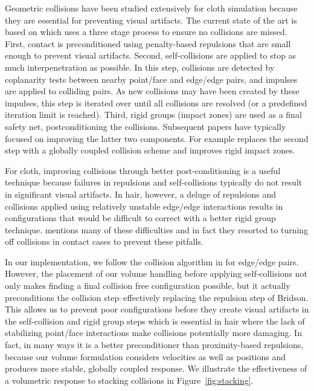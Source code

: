 Geometric collisions have been studied extensively for cloth simulation because
they are essential for preventing visual artifacts. The current state of the art
is based on \cite{bridson:2002:cloth} which uses a three stage process to ensure
no collisions are missed. First, contact is preconditioned using penalty-based
repulsions that are small enough to prevent visual artifacts. Second,
self-collisions are applied to stop as much interpenetration as
possible. In this step, collisions are detected by coplanarity tests
between nearby point/face and edge/edge pairs, and impulses are
applied to colliding pairs.  As new collisions may have been created
by these impulses, this step is iterated over until all collisions are
resolved (or a predefined iteration limit is reached). Third, rigid groups (impact zones) are used as 
a final safety net,
postconditioning the collisions. Subsequent papers have typically focused on
improving the latter two components. For example \cite{sifakis:2008:cloth}
replaces the second step with a globally coupled collision scheme and
\cite{harmon:2008:cloth} improves rigid impact zones.

For cloth, improving collisions through better post-conditioning is a useful
technique because failures in repulsions and self-collisions typically do not
result in significant visual artifacts.  In hair, however, a deluge of
repulsions and collisions applied using relatively unstable edge/edge
interactions results in configurations that would be difficult to correct with a
better rigid group technique.  \cite{selle:2008:hair} mentions many of these
difficulties and in fact they resorted to turning off collisions in contact
cases to prevent these pitfalls.

In our implementation, we follow the collision algorithm in
\cite{bridson:2002:cloth} for edge/edge pairs. However, the placement
of our volume handling before applying self-collisions not only makes
finding a final collision free configuration possible, but
it actually preconditions the collision step--effectively replacing the repulsion step of
Bridson.  This allows us to prevent poor configurations before they create
visual artifacts in the self-collision and rigid group steps which is essential
in hair where the lack of stabilizing point/face interactions make collisions
potentially more damaging.  In fact, in many ways it is a better preconditioner
than proximity-based repulsions, because our volume formulation considers
velocities as well as positions and produces more stable, globally coupled response. We illustrate the effectiveness of a
volumetric response to stacking collisions in Figure~\ref{fig:stacking}. 

